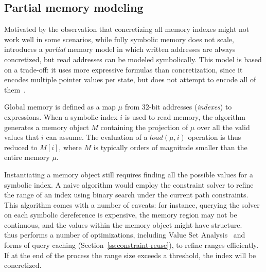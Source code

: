 \subsection{Partial memory modeling}
\label{ss:index-based-memory}

Motivated by the observation that concretizing all memory indexes might not work well in some scenarios, while fully symbolic memory does not scale, ~\cite{MAYHEM-SP12} introduces a {\em partial} memory model in which written addresses are always concretized, but read addresses can be modeled symbolically. This model is based on a trade-off: it uses more expressive formulas than concretization, since it encodes multiple pointer values per state, but does not attempt to encode all of them~\cite{MAYHEM-THESIS}. %


Global memory is defined as a map $\mu$ from 32-bit addresses ({\em indexes}) to expressions. When a symbolic index $i$ is used to read memory, the algorithm generates a memory object $M$ containing the projection of $\mu$ over all the valid values that $i$ can assume. The evaluation of a $load(\mu,i)$ operation is thus reduced to $M[i]$, where $M$ is typically orders of magnitude smaller than the entire memory $\mu$.

Instantiating a memory object still requires finding all the possible values for a symbolic index. A naive algorithm would employ the constraint solver to refine the range of an index using binary search under the current path constraints. This algorithm comes with a number of caveats: for instance, querying the solver on each symbolic dereference is expensive, the memory region may not be continuous, and the values within the memory object might have structure. ~\cite{MAYHEM-SP12} thus performs a number of optimizations, including Value Set Analysis~\cite{VSA-CC04} and forms of query caching (Section~\ref{ss:constraint-reuse}), to refine ranges efficiently. If at the end of the process the range size exceeds a threshold, the index will be concretized. %

